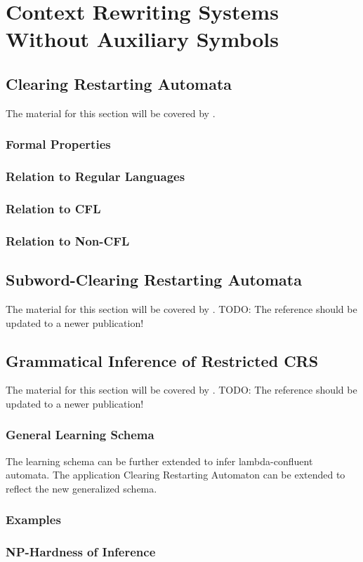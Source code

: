 \chapter{Context Rewriting Systems Without Auxiliary Symbols}

\section{Clearing Restarting Automata}

The material for this section will be covered by \cite{CM10}.

\subsection{Formal Properties}

\subsection{Relation to Regular Languages}

\subsection{Relation to CFL}

\subsection{Relation to Non-CFL}

\section{Subword-Clearing Restarting Automata}

The material for this section will be covered by \cite{C12}.
TODO: The reference should be updated to a newer publication!

\section{Grammatical Inference of Restricted CRS}

The material for this section will be covered by \cite{C12}.
TODO: The reference should be updated to a newer publication!

\subsection{General Learning Schema}

The learning schema can be further extended to infer lambda-confluent automata. 
The application Clearing Restarting Automaton can be extended to reflect the new generalized schema.

\subsection{Examples}

\subsection{NP-Hardness of Inference}

